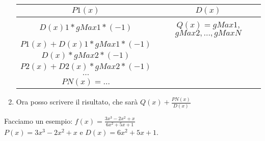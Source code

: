 \documentclass[11pt]{article}
\begin{document}
\begin{enumerate}
    \begin{tabular}{c|c}
        $P1(x)$ & $D(x)$\\
        \hline
        $D(x)1*gMax1*(-1)$ & $Q(x) = gMax1$, $gMax2, \dots, gMaxN$\\
        \hline
        $P1(x) + D(x)1*gMax1*(-1)$\\
        \hline
        $D(x)*gMax2*(-1)$\\
        \hline
        $P2(x) + D2(x)*gMax2*(-1)$\\
        \hline
        $\dots$\\
        \hline
        $PN(x) = \dots$
    \end{tabular}
    \item Ora posso scrivere il risultato, che sarà $Q(x) + \frac{PN(x)}{D(x)}$
\end{enumerate}
Facciamo un esempio: $f(x) = \frac{3x^3-2x^2+x}{6x^2+5x+1}$\\
$P(x) = 3x^3-2x^2+x$ e $D(x) = 6x^2+5x+1$.\\
\end{document}
